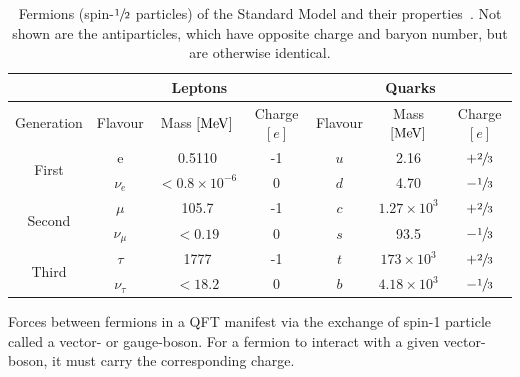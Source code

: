 \begin{table}[h]
	\centering
	\caption{Fermions (spin-$\sfrac{1}{2}$ particles) of the Standard Model and their properties~\cite{ParticleDataGroup}. Not shown are the antiparticles, which have opposite charge and baryon number, but are otherwise identical.}
	\begin{adjustbox}{max width=\textwidth}
		\label{tab:fermions}
		\renewcommand{\arraystretch}{1.5}
		\begin{tabular}{c|ccc|ccc}
			\toprule
			\hline
			                        & \multicolumn{3}{c}{Leptons} & \multicolumn{3}{|c}{Quarks}                                                                 \\
			\hline
			Generation              & Flavour                     & Mass $[\MeV]$               & Charge $[e]$ & Flavour & Mass $[\MeV]$      & Charge $[e]$    \\
			\hline
			\multirow{2}{*}{First}  & e                           & 0.5110                      & -1           & $u$     & 2.16               & $+\sfrac{2}{3}$ \\
			                        & $\nu_e$                     & $< 0.8 \times 10^{-6}$      & 0            & $d$     & 4.70               & $-\sfrac{1}{3}$ \\
			\hline
			\multirow{2}{*}{Second} & $\mu$                       & 105.7                       & -1           & $c$     & $1.27 \times 10^3$ & $+\sfrac{2}{3}$ \\
			                        & $\nu_\mu$                   & $< 0.19$                    & 0            & $s$     & 93.5               & $-\sfrac{1}{3}$ \\
			\hline
			\multirow{2}{*}{Third}  & $\tau$                      & 1777                        & -1           & $t$     & $173 \times 10^3$  & $+\sfrac{2}{3}$ \\
			                        & $\nu_\tau$                  & $< 18.2$                    & 0            & $b$     & $4.18 \times 10^3$ & $-\sfrac{1}{3}$ \\
			\hline
		\end{tabular}
	\end{adjustbox}
\end{table}

Forces between fermions in a QFT manifest via the exchange of spin-1 particle called a vector- or gauge-boson.
For a fermion to interact with a given vector-boson, it must carry the corresponding charge.

